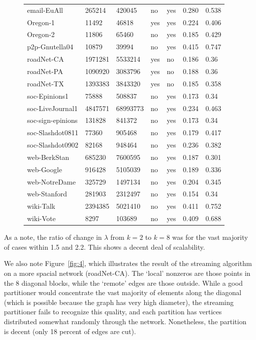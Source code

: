 \documentclass[11pt]{article}
\begin{document}
\begin{figure}
{\begin{tabular}{ *7l }
email-EuAll & 265214 & 420045 & no & yes & 0.280&0.538\\ 
Oregon-1 & 11492 & 46818 & yes & yes & 0.224&0.406\\ 
Oregon-2 & 11806 & 65460 & no & yes & 0.185&0.429\\ 
p2p-Gnutella04 & 10879 & 39994 & no & yes & 0.415&0.747\\ 
roadNet-CA & 1971281 & 5533214 & yes & no & 0.186&0.36\\ 
roadNet-PA & 1090920 & 3083796 & yes & no & 0.188&0.36\\ 
roadNet-TX & 1393383 & 3843320 & yes & no & 0.185&0.358\\ 
soc-Epinions1 & 75888 & 508837 & no & yes & 0.173&0.34\\ 
soc-LiveJournal1 & 4847571 & 68993773 & no & yes &0.234& 0.463\\ 
soc-sign-epinions & 131828 & 841372 & no & yes &0.173&0.34\\ 
soc-Slashdot0811 & 77360 & 905468 & no & yes &0.179&0.417\\ 
soc-Slashdot0902 & 82168 & 948464 & no & yes &0.236&0.382\\ 
web-BerkStan & 685230 & 7600595 & no & yes &0.187&0.301\\ 
web-Google & 916428 & 5105039 & no & yes &0.189&0.336\\ 
web-NotreDame & 325729 & 1497134 & no & yes &0.204&0.345\\ 
web-Stanford & 281903 & 2312497 & no & yes &0.154&0.34\\ 
wiki-Talk & 2394385 & 5021410 & no & yes &0.411&0.752\\ 
wiki-Vote  & 8297 & 103689 & no & yes &0.409&0.688\\ 
 \hline
\end{tabular}\par
}
\end{figure}

As a note, the ratio of change in $\lambda$ from $k=2$ to $k=8$ was for the vast majority of cases within 1.5 and 2.2. This shows a decent deal of scalability.

We also note Figure~\ref{fig:4}, which illustrates the result of the streaming algorithm on a more spacial network (roadNet-CA). The `local' nonzeros are those points in the 8 diagonal blocks, while the `remote' edges are those outside. While a good partitioner would concentrate the vast majority of elements along the diagonal (which is possible because the graph has very high diameter), the streaming partitioner fails to recognize this quality, and each partition has vertices distributed somewhat randomly through the network. Nonetheless, the partition is decent (only 18 percent of edges are cut). 
\end{document}
